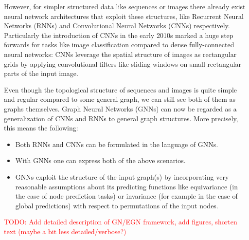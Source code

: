 However, for simpler structured data like sequences or images there already exist neural
network architectures that exploit these structures, like Recurrent Neural Networks (RNNs) and
Convolutional Neural Networks (CNNs) respectively. Particularly the introduction of CNNs 
in the early 2010s marked a huge step forwards for tasks like image classification 
compared to dense fully-connected neural networks: CNNs leverage the spatial structure of
images as rectangular grids by applying convolutional filters like sliding windows on small
rectangular parts of the input image. 

Even though the topological structure of sequences and images is quite simple and regular
compared to some general graph, we can still see both of them as graphs themselves. Graph Neural 
Networks (GNNs) can now be regarded as a generalization of CNNs and RNNs to general graph structures.
More precisely, this means the following:
\begin{itemize}
    \item Both RNNs and CNNs can be formulated in the language of GNNs.
    \item With GNNs one can express both of the above scenarios.
    \item GNNs exploit the structure of the input graph(s) by incorporating very
          reasonable assumptions about its predicting functions like equivariance
          (in the case of node prediction tasks) or invariance (for example in 
          the case of global predictions) with respect to permutations of the input
          nodes.
\end{itemize}

\textcolor{red}{TODO: Add detailed description of GN/EGN framework, add figures, shorten text (maybe a bit less detailed/verbose?)
}